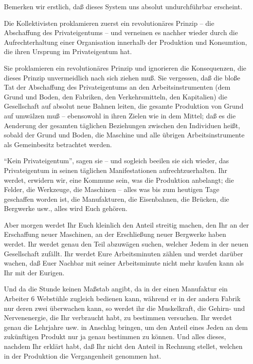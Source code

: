 \documentclass{scrbook}
\begin{document}
Bemerken wir erstlich, daß dieses System uns absolut undurchführbar erscheint.

Die Kollektivisten proklamieren zuerst ein revolutionäres Prinzip – die Abschaffung des Privateigentums – und verneinen es nachher wieder durch die Aufrechterhaltung einer Organisation innerhalb der Produktion und Konsumtion, die ihren Ursprung im Privateigentum hat.

Sie proklamieren ein revolutionäres Prinzip und ignorieren die Konsequenzen, die dieses Prinzip unvermeidlich nach sich ziehen muß. Sie vergessen, daß die bloße Tat der Abschaffung des Privateigentums an den Arbeitsinstrumenten (dem Grund und Boden, den Fabriken, den Verkehrsmitteln, den Kapitalien) die Gesellschaft auf absolut neue Bahnen leiten, die gesamte Produktion von Grund auf umwälzen muß – ebensowohl in ihren Zielen wie in dem Mittel; daß es die Aenderung der gesamten täglichen Beziehungen zwischen den Individuen heißt, sobald der Grund und Boden, die Maschine und alle übrigen Arbeitsinstrumente als Gemeinbesitz betrachtet werden.

``Kein Privateigentum'', sagen sie – und sogleich beeilen sie sich wieder, das Privateigentum in seinen täglichen Manifestationen aufrechtzuerhalten. Ihr werdet, erwidern wir, eine Kommune sein, was die Produktion anbelangt; die Felder, die Werkzeuge, die Maschinen – alles was bis zum heutigen Tage geschaffen worden ist, die Manufakturen, die Eisenbahnen, die Brücken, die Bergwerke usw., alles wird Euch gehören.

Aber morgen werdet Ihr Euch kleinlich den Anteil streitig machen, den Ihr an der Erschaffung neuer Maschinen, an der Erschließung neuer Bergwerke haben werdet. Ihr werdet genau den Teil abzuwägen suchen, welcher Jedem in der neuen Gesellschaft zufällt. Ihr werdet Eure Arbeitsminuten zählen und werdet darüber wachen, daß Euer Nachbar mit seiner Arbeitsminute nicht mehr kaufen kann als Ihr mit der Eurigen.

Und da die Stunde keinen Maßstab angibt, da in der einen Manufaktur ein Arbeiter 6 Webstühle zugleich bedienen kann, während er in der andern Fabrik nur deren zwei überwachen kann, so werdet ihr die Muskelkraft, die Gehirn- und Nervenenergie, die Ihr verbraucht habt, zu bestimmen versuchen. Ihr werdet genau die Lehrjahre usw. in Anschlag bringen, um den Anteil eines Jeden an dem zukünftigen Produkt nur ja genau bestimmen zu können. Und alles dieses, nachdem Ihr erklärt habt, daß Ihr nicht den Anteil in Rechnung stellet, welchen in der Produktion die Vergangenheit genommen hat.
\end{document}
